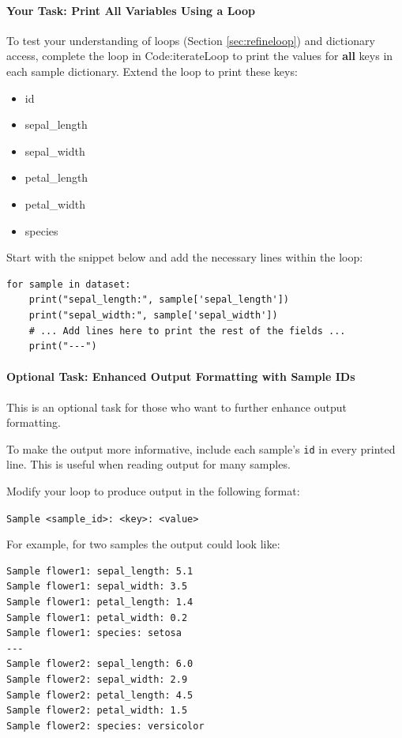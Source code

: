 \paragraph{Your Task: Print All Variables Using a Loop}
\label{sec:print_all_config}
To test your understanding of loops (Section \ref{sec:refineloop}) and dictionary access, complete the loop in Code:iterateLoop to print the values for \textbf{all} keys in each sample dictionary. Extend the loop to print these keys:

\begin{itemize}\setlength{\itemsep}{0pt}
    \item id
    \item sepal\_length
    \item sepal\_width
    \item petal\_length
    \item petal\_width
    \item species
\end{itemize}

Start with the snippet below and add the necessary lines within the loop:

\begin{verbatim}
for sample in dataset:
    print("sepal_length:", sample['sepal_length'])
    print("sepal_width:", sample['sepal_width'])
    # ... Add lines here to print the rest of the fields ...
    print("---")
\end{verbatim}

\paragraph{Optional Task: Enhanced Output Formatting with Sample IDs}

This is an optional task for those who want to further enhance output formatting.

To make the output more informative, include each sample's \texttt{id} in every printed line. This is useful when reading output for many samples.

Modify your loop to produce output in the following format:

\texttt{Sample <sample\_id>: <key>: <value>}

For example, for two samples the output could look like:

\begin{verbatim}
Sample flower1: sepal_length: 5.1
Sample flower1: sepal_width: 3.5
Sample flower1: petal_length: 1.4
Sample flower1: petal_width: 0.2
Sample flower1: species: setosa
---
Sample flower2: sepal_length: 6.0
Sample flower2: sepal_width: 2.9
Sample flower2: petal_length: 4.5
Sample flower2: petal_width: 1.5
Sample flower2: species: versicolor
\end{verbatim}

